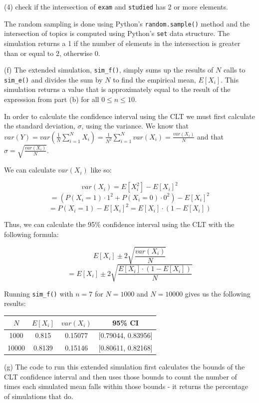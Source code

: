 \documentclass[10pt]{article}
\begin{document}
\indent\indent (4) check if the intersection of \texttt{exam} and \texttt{studied} has 2 or more elements.

The random sampling is done using Python's \texttt{random.sample()} method and the intersection of topics is computed using Python's \texttt{set} data structure. The simulation returns a 1 if the number of elements in the intersection is greater than or equal to 2, otherwise 0.

\noindent (f) The extended simulation, \texttt{sim\_f()}, simply sums up the results of $N$ calls to \texttt{sim\_e()} and divides the sum by $N$ to find the empirical mean, $E[X_i]$. This simulation returns a value that is approximately equal to the result of the expression from part (b) for all $0 \le n \le 10$.

In order to calculate the confidence interval using the CLT we must first calculate the standard deviation, $\sigma$, using the variance. We know that $var(Y) = var(\frac{1}{N}\sum_{i=1}^N X_i) = \frac{1}{N^2}\sum_{i=1}^N var(X_i) = \frac{var(X_i)}{N}$ and that $\sigma = \sqrt{\frac{var(X_i)}{N}}$.

We can calculate $var(X_i)$ like so:

$$var(X_i) = E[X_i^2] - E[X_i]^2$$
$$= (P(X_i = 1) \cdot 1^2 + P(X_i = 0) \cdot 0^2) - E[X_i]^2$$
$$= P(X_i = 1) - E[X_i]^2 = E[X_i] \cdot (1 - E[X_i])$$

Thus, we can calculate the 95\% confidence interval using the CLT with the following formula:

$$E[X_i] \pm 2 \sqrt{\frac{var(X_i)}{N}}$$
$$= E[X_i] \pm 2 \sqrt{\frac{E[X_i] \cdot (1 - E[X_i])}{N}}$$

Running \texttt{sim\_f()} with $n = 7$ for $N = 1000$ and $N = 10000$ gives us the following results:

\begin{center}
    \begin{tabular}{|c|c|c|c|}
        \hline
        $N$ & $E[X_i]$ & $var(X_i)$ & 95\% CI \\ \hline
        1000 & 0.815 & 0.15077 & [0.79044, 0.83956] \\ \hline
        10000 & 0.8139 & 0.15146 & [0.80611, 0.82168] \\ \hline
    \end{tabular}
\end{center}

\noindent (g) The code to run this extended simulation first calculates the bounds of the CLT confidence interval and then uses those bounds to count the number of times each simulated mean falls within those bounds - it returns the percentage of simulations that do.
\end{document}
